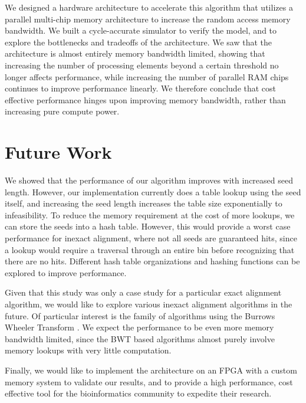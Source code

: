 \documentclass[11pt]{article}
\begin{document}
We designed a hardware architecture to accelerate this algorithm that utilizes a parallel multi-chip memory architecture to increase the random access memory bandwidth.  We built a cycle-accurate simulator to verify the model, and to explore the bottlenecks and tradeoffs of the architecture.  We saw that the architecture is almost entirely memory bandwidth limited, showing that increasing the number of processing elements beyond a certain threshold no longer affects performance, while increasing the number of parallel RAM chips continues to improve performance linearly.  We therefore conclude that cost effective performance hinges upon improving memory bandwidth, rather than increasing pure compute power.

\section{Future Work}

We showed that the performance of our algorithm improves with increased seed length.  However, our implementation currently does a table lookup using the seed itself, and increasing the seed length increases the table size exponentially to infeasibility.  To reduce the memory requirement at the cost of more lookups, we can store the seeds into a hash table.  However, this would provide a worst case performance for inexact alignment, where not all seeds are guaranteed hits, since a lookup would require a traversal through an entire bin before recognizing that there are no hits.  Different hash table organizations and hashing functions can be explored to improve performance.


Given that this study was only a case study for a particular exact alignment algorithm, we would like to explore various inexact alignment algorithms in the future.  Of particular interest is the family of algorithms using the Burrows Wheeler Transform \cite{li2009fast}.  We expect the performance to be even more memory bandwidth limited, since the BWT based algorithms almost purely involve memory lookups with very little computation.


Finally, we would like to implement the architecture on an FPGA with a custom memory system to validate our results, and to provide a high performance, cost effective tool for the bioinformatics community to expedite their research.





{
  
}
\end{document}
